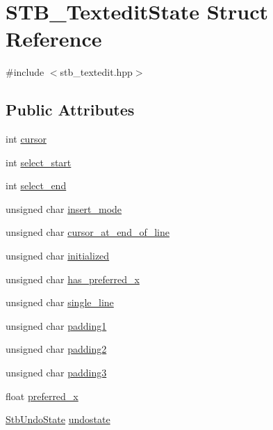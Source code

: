 \hypertarget{struct_s_t_b___textedit_state}{}\section{S\+T\+B\+\_\+\+Textedit\+State Struct Reference}
\label{struct_s_t_b___textedit_state}


{\ttfamily \#include $<$stb\+\_\+textedit.\+hpp$>$}

\subsection*{Public Attributes}
\begin{DoxyCompactItemize}
\item 
int \hyperlink{struct_s_t_b___textedit_state_a7a1414f3286070306a5184f9473ccf9f}{cursor}
\item 
int \hyperlink{struct_s_t_b___textedit_state_a74d595403e0b6f99cd0163ee87f4344d}{select\+\_\+start}
\item 
int \hyperlink{struct_s_t_b___textedit_state_abf8b1b1064770e4579c5bb8c4a41d8f0}{select\+\_\+end}
\item 
unsigned char \hyperlink{struct_s_t_b___textedit_state_af26029a4f1f76d043afd35072fabcb4b}{insert\+\_\+mode}
\item 
unsigned char \hyperlink{struct_s_t_b___textedit_state_a0e7ba5f610f5dc2d643bef0f223ada9c}{cursor\+\_\+at\+\_\+end\+\_\+of\+\_\+line}
\item 
unsigned char \hyperlink{struct_s_t_b___textedit_state_a11a63150e95225aacd204d6ef160c0c0}{initialized}
\item 
unsigned char \hyperlink{struct_s_t_b___textedit_state_aaca2d581ed565f86288038816274e007}{has\+\_\+preferred\+\_\+x}
\item 
unsigned char \hyperlink{struct_s_t_b___textedit_state_a63299aca2cb4e009dfa41cda5e651316}{single\+\_\+line}
\item 
unsigned char \hyperlink{struct_s_t_b___textedit_state_a1e43e8ac88a8c7f2bba645b333a8bdc7}{padding1}
\item 
unsigned char \hyperlink{struct_s_t_b___textedit_state_af5a708e49f23f79bb14c9b0f4ad03371}{padding2}
\item 
unsigned char \hyperlink{struct_s_t_b___textedit_state_a4c42530e4919171df25b1f00bb95a887}{padding3}
\item 
float \hyperlink{struct_s_t_b___textedit_state_a527319df94e0fe262548fb48bebf3dea}{preferred\+\_\+x}
\item 
\hyperlink{struct_stb_undo_state}{Stb\+Undo\+State} \hyperlink{struct_s_t_b___textedit_state_a7e1f0366bbd57e01a4f49a720beb9ead}{undostate}
\end{DoxyCompactItemize}


